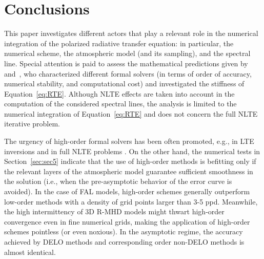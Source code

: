 \documentclass[iop,numberedappendix,twocolappendix,twocolumn]{emulateapj}
\begin{document}
\section{Conclusions}\label{sec:sec6}
This paper investigates different actors that play a relevant role in the numerical integration of the polarized radiative transfer equation:
in particular, the numerical scheme, the atmospheric model (and its sampling), and the spectral line.
Special attention is paid to assess the mathematical predictions given by \citet{janett2017a,janett2017b} and~\citet{janett2018a},
who characterized different formal solvers (in terms of order of accuracy, numerical stability, and computational cost)
and investigated the stiffness of Equation~\eqref{eq:RTE}.
Although NLTE effects are taken into account in the computation of the considered spectral lines, 
the analysis is limited to the numerical integration of Equation~\eqref{eq:RTE} and does not concern the full NLTE iterative problem.

The urgency of high-order formal solvers has been often promoted,
e.g., in LTE inversions \citep{bellot_rubio+al1998} and in full NLTE problems \citep{trujillo_bueno2003}.
On the other hand, the numerical tests in Section~\ref{sec:sec5} indicate that the use of high-order methods is befitting
only if the relevant layers of the atmospheric model guarantee sufficient smoothness in the solution
(i.e., when the pre-asymptotic behavior of the error curve is avoided).
In the case of FAL models, high-order schemes generally outperform low-order methods with a density of grid points larger than 3-5 ppd.
Meanwhile, the high intermittency of 3D R-MHD models might thwart high-order convergence even in fine numerical grids,
making the application of high-order schemes pointless (or even noxious).
In the asymptotic regime, the accuracy achieved by DELO methods and corresponding order non-DELO methods is almost identical.

\end{document}
